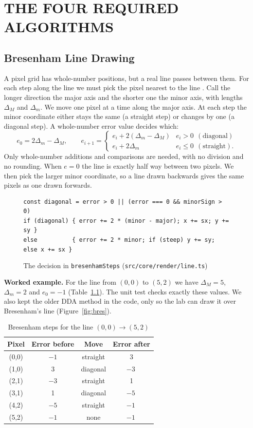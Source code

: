 \chapter{THE FOUR REQUIRED ALGORITHMS}\nonum

\section{Bresenham Line Drawing}
A pixel grid has whole-number positions, but a real line passes between them. For each step along the line we must pick the pixel nearest to the line \cite{bresenham1965}. Call the longer direction the major axis and the shorter one the minor axis, with lengths $\Delta_M$ and $\Delta_m$. We move one pixel at a time along the major axis. At each step the minor coordinate either stays the same (a straight step) or changes by one (a diagonal step). A whole-number error value decides which:
\[
e_0 = 2\Delta_m-\Delta_M,\qquad
e_{i+1}=\begin{cases} e_i+2(\Delta_m-\Delta_M) & e_i>0\ \ (\text{diagonal})\\ e_i+2\Delta_m & e_i\le 0\ \ (\text{straight}).\end{cases}
\]
Only whole-number additions and comparisons are needed, with no division and no rounding. When $e=0$ the line is exactly half way between two pixels. We then pick the larger minor coordinate, so a line drawn backwards gives the same pixels as one drawn forwards.

\begin{figure}[H]
\centering
\begin{lstlisting}[style=code]
const diagonal = error > 0 || (error === 0 && minorSign > 0)
if (diagonal) { error += 2 * (minor - major); x += sx; y += sy }
else          { error += 2 * minor; if (steep) y += sy; else x += sx }
\end{lstlisting}
\caption{The decision in \texttt{bresenhamSteps} (\texttt{src/core/render/line.ts})}
\label{fig:brescode}
\end{figure}

\textbf{Worked example.} For the line from $(0,0)$ to $(5,2)$ we have $\Delta_M=5$, $\Delta_m=2$ and $e_0=-1$ (Table~\ref{tab:bres}). The unit test checks exactly these values. We also kept the older DDA method in the code, only so the lab can draw it over Bresenham's line (Figure~\ref{fig:bres}).

\begin{table}[H]
\centering
\caption{Bresenham steps for the line $(0,0)\to(5,2)$}
\label{tab:bres}
\small
\begin{tabular}{@{}cccc@{}}
\toprule
Pixel & Error before & Move & Error after\\
\midrule
(0,0) & $-1$ & straight & 3\\
(1,0) & 3 & diagonal & $-3\ $\\
(2,1) & $-3$ & straight & 1\\
(3,1) & 1 & diagonal & $-5\ $\\
(4,2) & $-5$ & straight & $-1\ $\\
(5,2) & $-1$ & none & $-1\ $\\
\bottomrule
\end{tabular}
\end{table}


